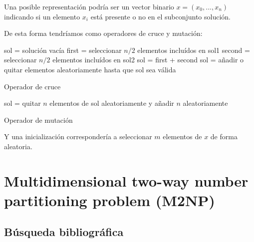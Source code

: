 \documentclass[13pt,a4paper]{article}
\begin{document}
Una posible representación podría ser un vector binario $x = (x_{0}, ..., x_{n})$ indicando si un elemento $x_{i}$ está presente o no en el subconjunto solución.

\vspace{\baselineskip}

De esta forma tendríamos como operadores de cruce y mutación:

\begin{algorithm}[H]
    \SetAlgoLined
        sol = solución vacía \;
        first = seleccionar $n/2$ elementos incluídos en sol1 \;
        second = seleccionar $n/2$ elementos incluídos en sol2 \;
        sol = first + second \;        
        sol = añadir o quitar elementos aleatoriamente hasta que sol sea válida \;
    \caption{Operador de cruce}
\end{algorithm}

\vspace{\baselineskip}

\begin{algorithm}[H]
    \SetAlgoLined
        sol = quitar $n$ elementos de sol aleatoriamente y añadir $n$ aleatoriamente \;
    \caption{Operador de mutación}
\end{algorithm}

\vspace{\baselineskip}

Y una inicialización correspondería a seleccionar $m$ elementos de $x$ de forma aleatoria.

\newpage

\section{Multidimensional two-way number partitioning problem (M2NP)}

\subsection{Búsqueda bibliográfica}

\end{document}
